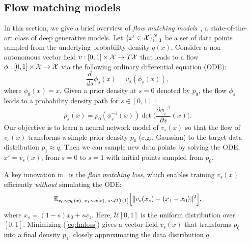\subsection{Flow matching models} 
\label{sec:prelim-part2}
In this section, we give a brief overview of \textit{flow matching models}~\cite{lipman2022flow,lipman2024flow}, a state-of-the-art class of deep generative models.
Let $\{x^i \in {\cal X}\}_{i=1}^{N}$ be a set of data points sampled from the underlying probability density $q(x)$. 
Consider a non-autonomous vector field $v:[0,1] \times {\cal X} \to T{\cal X}$ that leads to a flow $\phi:[0,1] \times {\cal X} \to {\cal X}$ via the following ordinary differential equation (ODE): 
\begin{equation}
    \frac{d}{ds}\phi_s(x) = v_s(\phi_s(x)),     
\end{equation}
where $\phi_0(x) = x$.
Given a prior density at $s=0$ denoted by $p_0$, the flow $\phi_s$ leads to a probability density path for $s \in [0,1]$~\cite{lipman2022flow}: 
\begin{equation}
    p_s(x) = p_0(\phi_s^{-1}(x)) \det\big(\frac{\partial \phi_s^{-1}}{\partial x}(x)\big).
\end{equation}
Our objective is to learn a neural network model of $v_s(x)$ so that the flow of $v_s(x)$ transforms a simple prior density $p_0$ (e.g., Gaussian) to the target data distribution $p_1 \approx q$. Then we can sample new data points by solving the ODE, $x'=v_s(x)$, from $s=0$ to $s=1$ with initial points sampled from $p_0$. 

A key innovation in~\cite{lipman2022flow,lipman2024flow} is the \emph{flow matching loss}, which enables training \(v_s(x)\) efficiently \emph{without} simulating the ODE:
\begin{equation}
\label{eq:fmloss}
\mathbb{E}_{x_0 \sim p_0(x), \; x_1 \sim q(x), \; s \sim \mathcal{U}[0,1]}
\Bigl[
    \| v_s(x_s) - (x_1 - x_0) \|^2
\Bigr],
\end{equation}
where $x_s = (1-s)x_0 + s x_1$.
Here, \(\mathcal{U}[0,1]\) is the uniform distribution over \([0,1]\). Minimizing (\ref{eq:fmloss}) gives a vector field \(v_s(x)\) that transforms \(p_0\) into a final density \(p_1\), closely approximating the data distribution \(q\).

